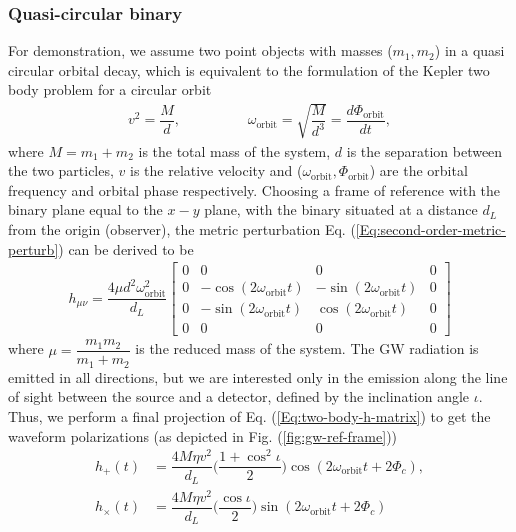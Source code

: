 \subsubsection{Quasi-circular binary}\label{sec:circular-binary}
For demonstration, we assume two point objects with masses ($m_1, m_2$) in a quasi circular orbital decay, which is equivalent to the formulation of the Kepler two body problem for a circular orbit 
\begin{align}
    v^2 = \dfrac{M}{d}, \hspace{2cm} \omega_{\text{orbit}} = \sqrt{\dfrac{M}{d^3}} = \dfrac{d\Phi_{\text{orbit}}}{dt},
\end{align}
where $M = m_1 + m_2$ is the total mass of the system, $d$ is the separation between the two particles, $v$ is the relative velocity and ($\omega_{\text{orbit}}, \Phi_{\text{orbit}}$) are the orbital frequency and orbital phase respectively. Choosing a frame of reference with the binary plane equal to the $x-y$ plane, with the binary situated at a distance $d_L$ from the origin (observer), the metric perturbation Eq. (\ref{Eq:second-order-metric-perturb}) can be derived to be 
\begin{align}
   h_{\mu\nu} = \dfrac{4\mu d^2\omega_{\text{orbit}}^2}{d_L} \begin{bmatrix}
                0 & 0 & 0 & 0 \\
                0 & -\cos(2\omega_{\text{orbit}}t) & -\sin(2\omega_{\text{orbit}}t) & 0 \\
                0 & -\sin(2\omega_{\text{orbit}}t) & \cos(2\omega_{\text{orbit}}t) & 0 \\
                0 & 0 & 0 & 0 
                \end{bmatrix}
    \label{Eq:two-body-h-matrix}
\end{align}
where $\mu = \dfrac{m_1m_2}{m_1+m_2}$ is the reduced mass of the system. The GW radiation is emitted in all directions, but we are interested only in the emission along the line of sight between the source and a detector, defined by the inclination angle $\iota$. Thus, we perform a final projection of Eq. (\ref{Eq:two-body-h-matrix}) to get the waveform polarizations (as depicted in Fig. (\ref{fig:gw-ref-frame}))
\begin{align}
    h_{+}(t) &= \dfrac{4M\eta v^2}{d_L}\Big(\dfrac{1+\cos^2\iota}{2}\Big)\cos(2\omega_{\text{orbit}}t+2\Phi_c), \label{Eq:toymodel-plus}\\
    h_{\times}(t) &= \dfrac{4M\eta v^2}{d_L}\Big(\dfrac{\cos \iota}{2}\Big)\sin(2\omega_{\text{orbit}}t+2\Phi_c) \label{Eq:toymodel-cross}
\end{align}
